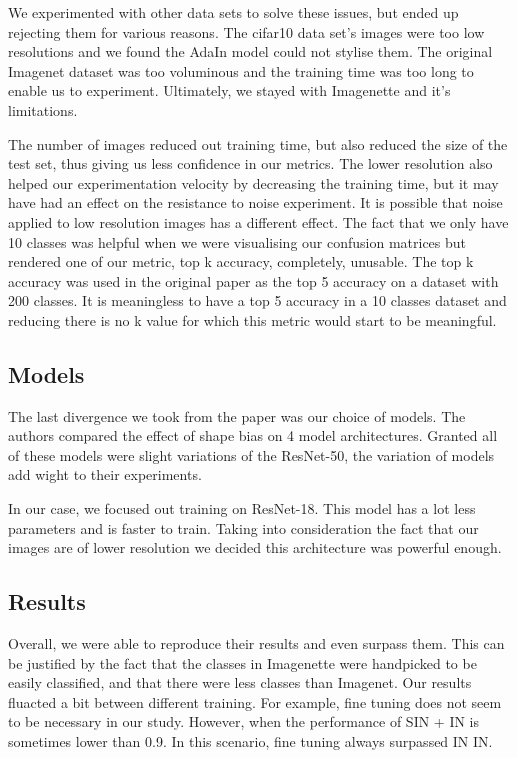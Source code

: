 \documentclass{article}
\begin{document}
We experimented with other data sets to solve these issues, but ended up rejecting them for various reasons. The cifar10 data set's images were too low resolutions and we found the AdaIn model could not stylise them.
The original Imagenet dataset was too voluminous and the training time was too long to enable us to experiment.
Ultimately, we stayed with Imagenette and it's limitations.

The number of images reduced out training time, but also reduced the size of the test set, thus giving us less confidence in our metrics.
The lower resolution also helped our experimentation velocity by decreasing the training time, but it may have had an effect on the resistance to noise experiment. It is possible that noise applied to low resolution images has a different effect.
The fact that we only have 10 classes was helpful when we were visualising our confusion matrices but rendered one of our metric, top k accuracy, completely, unusable. The top k accuracy was used in the original paper as the top 5 accuracy on a dataset with 200 classes. It is meaningless to have a top 5 accuracy in a 10 classes dataset and reducing there is no k value for which this metric would start to be meaningful.

\subsection{Models}

The last divergence we took from the paper was our choice of models. The authors compared the effect of shape bias on 4 model architectures. Granted all of these models were slight variations of the ResNet-50, the variation of models add wight to their experiments.

In our case, we focused out training on ResNet-18. This model has a lot less parameters and is faster to train. Taking into consideration the fact that our images are of lower resolution we decided this architecture was powerful enough.

\subsection{Results}

Overall, we were able to reproduce their results and
even surpass them. This can be justified by the fact that the classes
in Imagenette were handpicked to be easily classified, and that there were less 
classes than Imagenet.
Our results fluacted a bit between different training. For example, fine tuning does not seem to be necessary 
in our study. However, when the performance of SIN + IN is sometimes lower than 0.9. In this scenario, fine tuning
always surpassed IN \texorpdfstring{\textrightarrow} .IN. \medskip \par 
\end{document}
